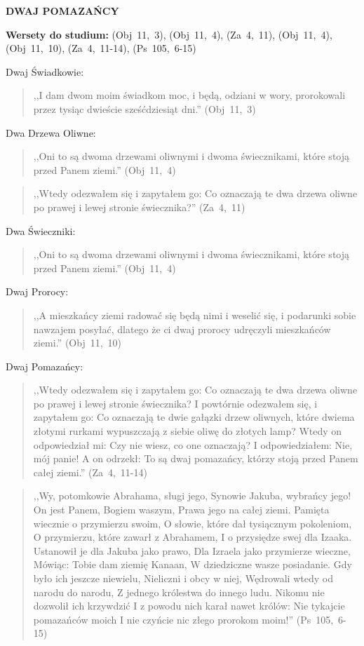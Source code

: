 \documentclass[10pt,a4paper,oneside]{article}
\begin{document}
\centerline{\textbf{\MakeUppercase{Dwaj Pomazańcy}}}
\begin{center}
\textbf{Wersety do studium:} (Obj~11,~3), (Obj~11,~4), (Za~4,~11), (Obj~11,~4), (Obj~11,~10), (Za~4,~11-14), (Ps~105,~6-15)
\end{center}
Dwaj Świadkowie:
\begin{quote}
,,I dam dwom moim świadkom moc, i będą, odziani w wory, prorokowali przez tysiąc dwieście sześćdziesiąt dni.'' (Obj~11,~3)
\end{quote}
Dwa Drzewa Oliwne:
\begin{quote}
,,Oni to są dwoma drzewami oliwnymi i dwoma świecznikami, które stoją przed Panem ziemi.'' (Obj~11,~4)
\end{quote}
\begin{quote}
,,Wtedy odezwałem się i zapytałem go: Co oznaczają te dwa drzewa oliwne po prawej i lewej stronie świecznika?'' (Za~4,~11)
\end{quote}
Dwa Świeczniki:
\begin{quote}
,,Oni to są dwoma drzewami oliwnymi i dwoma świecznikami, które stoją przed Panem ziemi.'' (Obj~11,~4)
\end{quote}
Dwaj Prorocy:
\begin{quote}
,,A mieszkańcy ziemi radować się będą nimi i weselić się, i podarunki sobie nawzajem posyłać, dlatego że ci dwaj prorocy udręczyli mieszkańców ziemi.'' (Obj~11,~10)
\end{quote}
Dwaj Pomazańcy:
\begin{quote}
,,Wtedy odezwałem się i zapytałem go: Co oznaczają te dwa drzewa oliwne po prawej i lewej stronie świecznika? I powtórnie odezwałem się, i zapytałem go: Co oznaczają te dwie gałązki drzew oliwnych, które dwiema złotymi rurkami wypuszczają z siebie oliwę do złotych lamp? Wtedy on odpowiedział mi: Czy nie wiesz, co one oznaczają? I odpowiedziałem: Nie, mój panie! A on odrzekł: To są dwaj pomazańcy, którzy stoją przed Panem całej ziemi.'' (Za~4,~11-14)
\end{quote}
\begin{quote}
,,Wy, potomkowie Abrahama, sługi jego, Synowie Jakuba, wybrańcy jego! On jest Panem, Bogiem waszym, Prawa jego na całej ziemi. Pamięta wiecznie o przymierzu swoim, O słowie, które dał tysiącznym pokoleniom, O przymierzu, które zawarł z Abrahamem, I o przysiędze swej dla Izaaka. Ustanowił je dla Jakuba jako prawo, Dla Izraela jako przymierze wieczne, Mówiąc: Tobie dam ziemię Kanaan, W dziedziczne wasze posiadanie. Gdy było ich jeszcze niewielu, Nieliczni i obcy w niej, Wędrowali wtedy od narodu do narodu, Z jednego królestwa do innego ludu. Nikomu nie dozwolił ich krzywdzić I z powodu nich karał nawet królów: Nie tykajcie pomazańców moich I nie czyńcie nic złego prorokom moim!'' (Ps~105,~6-15)
\end{quote}
\end{document}
